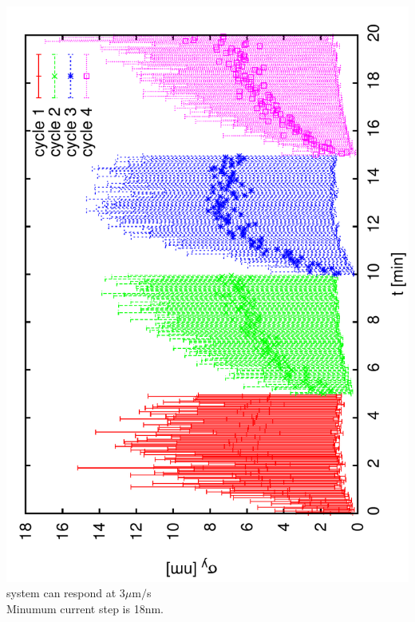 \documentclass[a4paper,11pt]{book}
\begin{document}
\includegraphics[angle=-90,scale=0.22]{image05.pdf}\\
system can respond at 3$\mu$m$/$s\\
Minumum current step is 18nm.
\end{document}

